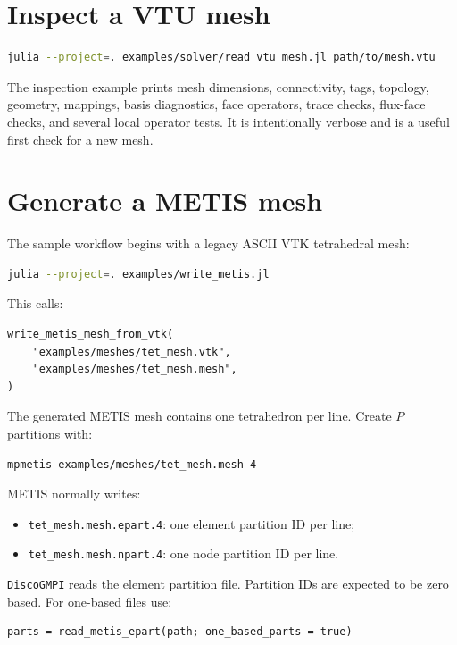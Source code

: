 \documentclass[11pt,oneside]{book}
\newcommand{\pkg}{\texttt{DiscoGMPI}}
\newcommand{\code}[1]{\texttt{#1}}
\begin{document}
\section{Inspect a VTU mesh}

\begin{lstlisting}[language=bash]
julia --project=. examples/solver/read_vtu_mesh.jl path/to/mesh.vtu
\end{lstlisting}

The inspection example prints mesh dimensions, connectivity, tags, topology,
geometry, mappings, basis diagnostics, face operators, trace checks, flux-face
checks, and several local operator tests. It is intentionally verbose and is a
useful first check for a new mesh.

\section{Generate a METIS mesh}

The sample workflow begins with a legacy ASCII VTK tetrahedral mesh:

\begin{lstlisting}[language=bash]
julia --project=. examples/write_metis.jl
\end{lstlisting}

This calls:

\begin{lstlisting}
write_metis_mesh_from_vtk(
    "examples/meshes/tet_mesh.vtk",
    "examples/meshes/tet_mesh.mesh",
)
\end{lstlisting}

The generated METIS mesh contains one tetrahedron per line. Create $P$
partitions with:

\begin{lstlisting}[language=bash]
mpmetis examples/meshes/tet_mesh.mesh 4
\end{lstlisting}

METIS normally writes:

\begin{itemize}[leftmargin=*]
  \item \code{tet\_mesh.mesh.epart.4}: one element partition ID per line;
  \item \code{tet\_mesh.mesh.npart.4}: one node partition ID per line.
\end{itemize}

\pkg{} reads the element partition file. Partition IDs are expected to be
zero based. For one-based files use:

\begin{lstlisting}
parts = read_metis_epart(path; one_based_parts = true)
\end{lstlisting}
\end{document}
